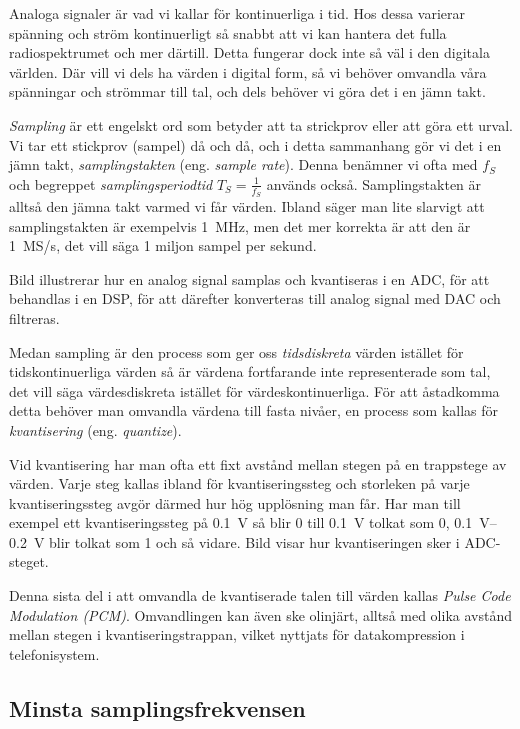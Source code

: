 Analoga signaler är vad vi kallar för kontinuerliga i tid.
Hos dessa varierar spänning och ström kontinuerligt så snabbt att vi kan hantera
det fulla radiospektrumet och mer därtill.
Detta fungerar dock inte så väl i den digitala världen.
Där vill vi dels ha värden i digital form, så vi behöver omvandla våra
spänningar och strömmar till tal, och dels behöver vi göra det i en jämn takt.

\emph{Sampling} är ett engelskt ord som betyder att ta strickprov eller att göra ett urval.
Vi tar ett stickprov (sampel) då och då, och i detta sammanhang gör vi det i en
jämn takt, \emph{samplingstakten} (eng. \emph{sample rate}).
Denna benämner vi ofta med \(f_S\) och begreppet \emph{samplingsperiodtid}
\(T_S=\frac{1}{f_S}\) används också.
Samplingstakten är alltså den jämna takt varmed vi får värden.
Ibland säger man lite slarvigt att samplingstakten är exempelvis
\qty{1}{\mega\hertz}, men det mer korrekta är att den är 1~MS/s, det vill säga 1
miljon sampel per sekund.

Bild  illustrerar hur en analog signal samplas och
kvantiseras i en ADC, för att behandlas i en DSP, för att därefter konverteras
till analog signal med DAC och filtreras.

Medan sampling är den process som ger oss \emph{tidsdiskreta} värden istället
för tidskontinuerliga värden så är värdena fortfarande inte representerade som
tal, det vill säga värdesdiskreta istället för värdeskontinuerliga.
För att åstadkomma detta behöver man omvandla värdena till fasta nivåer, en
process som kallas för \emph{kvantisering} (eng. \emph{quantize}).

Vid kvantisering har man ofta ett fixt avstånd mellan stegen på en
trappstege av värden.
Varje steg kallas ibland för kvantiseringssteg och storleken på varje
kvantiseringssteg avgör därmed hur hög upplösning man får.
Har man till exempel ett kvantiseringssteg på \qty{0,1}{\volt} så blir 0 till
\qty{0,1}{\volt} tolkat som 0, \SIrange{0,1}{0,2}{\volt} blir tolkat som 1 och
så vidare.
Bild  visar hur kvantiseringen sker i ADC-steget.

Denna sista del i att omvandla de kvantiserade talen till värden kallas
\emph{Pulse Code Modulation (PCM)}.
Omvandlingen kan även ske olinjärt, alltså med olika avstånd mellan stegen i
kvantiseringstrappan, vilket nyttjats för datakompression i telefonisystem.

\subsection{Minsta samplingsfrekvensen}
\label{nyquist}

